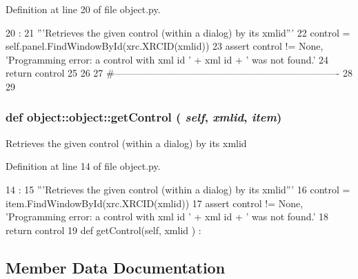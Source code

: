 Definition at line 20 of file object.py.


\begin{DoxyCode}
20                                  :
21         '''Retrieves the given control (within a dialog) by its xmlid'''
22         control = self.panel.FindWindowById(xrc.XRCID(xmlid))
23         assert control != None, 'Programming error: a control with xml id ' + xml
      id + ' was not found.'
24         return control
25 
26                 
27 #----------------------------------------------------------------------
28 
29     
    
\end{DoxyCode}
\hypertarget{classobject_1_1object_ac765747a2b581d48eeb94e600c31fc3f}{
\subsubsection[{getControl}]{\setlength{\rightskip}{0pt plus 5cm}def object::object::getControl ( {\em self}, \/   {\em xmlid}, \/   {\em item})}}
\label{classobject_1_1object_ac765747a2b581d48eeb94e600c31fc3f}
\begin{DoxyVerb}Retrieves the given control (within a dialog) by its xmlid\end{DoxyVerb}
 

Definition at line 14 of file object.py.


\begin{DoxyCode}
14                                        :
15         '''Retrieves the given control (within a dialog) by its xmlid'''
16         control = item.FindWindowById(xrc.XRCID(xmlid))
17         assert control != None, 'Programming error: a control with xml id ' + xml
      id + ' was not found.'
18         return control
19 
    def getControl(self, xmlid ) :
\end{DoxyCode}


\subsection{Member Data Documentation}
\hypertarget{classobject_1_1object_a4fbaf843d1f40843b2c3895cb73ffada}{
\subsubsection[{cat}]{}}
\label{classobject_1_1object_a4fbaf843d1f40843b2c3895cb73ffada}


